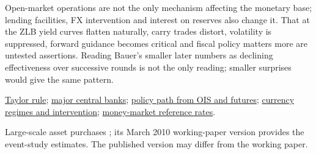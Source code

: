 \begin{qfdefinition}
 Open-market operations are not the only mechanism affecting the monetary base; lending facilities, FX intervention and interest on reserves also change it. That at the ZLB yield curves flatten naturally, carry trades distort, volatility is suppressed, forward guidance becomes critical and fiscal policy matters more are untested assertions. Reading Bauer's smaller later numbers as declining effectiveness over successive rounds is not the only reading; smaller surprises would give the same pattern.

 \hyperref[mod:taylor-rule]{Taylor rule}; \hyperref[rule:major-central-banks-current]{major central banks}; \hyperref[meth:policy-path-ois-futures]{policy path from OIS and futures}; \hyperref[def:currency-regimes-intervention]{currency regimes and intervention}; \hyperref[def:money-market-reference-rates]{money-market reference rates}.

 Large-scale asset purchases \citep{rt-gagnon-lsap-2011}; its March 2010 working-paper version \citep{nyfed-sr441} provides the event-study estimates. The published version may differ from the working paper.

\end{qfdefinition}

